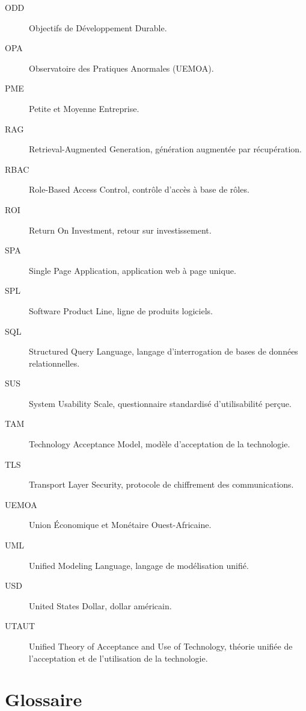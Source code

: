 \begin{description}
    \item[ODD] Objectifs de Développement Durable.
    \item[OPA] Observatoire des Pratiques Anormales (UEMOA).
    \item[PME] Petite et Moyenne Entreprise.
    \item[RAG] Retrieval-Augmented Generation, génération augmentée par récupération.
    \item[RBAC] Role-Based Access Control, contrôle d'accès à base de rôles.
    \item[ROI] Return On Investment, retour sur investissement.
    \item[SPA] Single Page Application, application web à page unique.
    \item[SPL] Software Product Line, ligne de produits logiciels.
    \item[SQL] Structured Query Language, langage d'interrogation de bases de données relationnelles.
    \item[SUS] System Usability Scale, questionnaire standardisé d'utilisabilité perçue.
    \item[TAM] Technology Acceptance Model, modèle d'acceptation de la technologie.
    \item[TLS] Transport Layer Security, protocole de chiffrement des communications.
    \item[UEMOA] Union Économique et Monétaire Ouest-Africaine.
    \item[UML] Unified Modeling Language, langage de modélisation unifié.
    \item[USD] United States Dollar, dollar américain.
    \item[UTAUT] Unified Theory of Acceptance and Use of Technology, théorie unifiée de l'acceptation et de l'utilisation de la technologie.
\end{description}

\chapter*{Glossaire}
\label{chap:glossaire}

